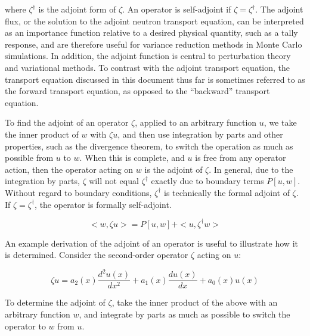 \documentclass[10pt]{article}
\begin{document}
\begin{flushleft}
where \(\zeta^\dagger\) is the adjoint form of \(\zeta\). An operator is self-adjoint if \(\zeta=\zeta^\dagger\). The adjoint flux, or the solution to the adjoint neutron transport equation, can be interpreted as an importance function relative to a desired physical quantity, such as a tally response, and are therefore useful for variance reduction methods in Monte Carlo simulations. In addition, the adjoint function is central to perturbation theory and variational methods. To contrast with the adjoint transport equation, the transport equation discussed in this document thus far is sometimes referred to as the forward transport equation, as opposed to the ``backward'' transport equation. 

To find the adjoint of an operator \(\zeta\), applied to an arbitrary function \(u\), we take the inner product of \(w\) with \(\zeta u\), and then use integration by parts and other properties, such as the divergence theorem, to switch the operation as much as possible from \(u\) to \(w\). When this is complete, and \(u\) is free from any operator action, then the operator acting on \(w\) is the adjoint of \(\zeta\). In general, due to the integration by parts, \(\zeta\) will not equal \(\zeta^\dagger\) exactly due to boundary terms \(P[u,w]\). Without regard to boundary conditions, \(\zeta^\dagger\) is technically the formal adjoint of \(\zeta\). If \(\zeta=\zeta^\dagger\), the operator is formally self-adjoint.

\begin{equation}
\label{eq:FormalAdjointDefinition}
<w, \zeta u> = P[u,w] + <u, \zeta^\dagger w>
\end{equation}

\begin{tcolorbox}[breakable]
An example derivation of the adjoint of an operator is useful to illustrate how it is determined. Consider the second-order operator \(\zeta\) acting on \(u\):

\begin{equation}
\zeta u=a_2(x)\frac{d^2u(x)}{dx^2}+a_1(x)\frac{du(x)}{dx}+a_0(x)u(x)
\end{equation}

To determine the adjoint of \(\zeta\), take the inner product of the above with an arbitrary function \(w\), and integrate by parts as much as possible to switch the operator to \(w\) from \(u\).


\end{tcolorbox}
\end{flushleft}
\end{document}
